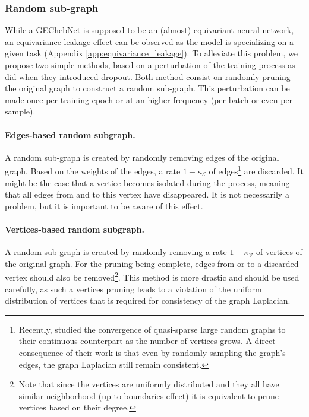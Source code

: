 \documentclass{article}
\newcommand{\haguettaz}[1]{{\color[rgb]{.8,.3,.2}{#1}}}
\begin{document}
\haguettaz{Figures pooling and unpooling?}

\subsubsection{Random sub-graph}

While a GEChebNet is supposed to be an (almost)-equivariant neural network, an equivariance leakage effect can be observed as the model is specializing on a given task (Appendix \ref{app:equivariance_leakage}). To alleviate this problem, we propose two simple methods, based on a perturbation of the training process as \cite{srivastava2014dropout} did when they introduced dropout. Both method consist on randomly pruning the original graph to construct a random sub-graph. This perturbation can be made once per training epoch or at an higher frequency (per batch or even per sample).

\paragraph{Edges-based random subgraph.} 
A random sub-graph is created by randomly removing edges of the original graph. Based on the weights of the edges, a rate $1 - \kappa_\mathcal{E}$ of edges\footnote{Recently, \cite{keriven2020convergence} studied the convergence of quasi-sparse large random graphs to their continuous counterpart as the number of vertices grows. A direct consequence of their work is that even by randomly sampling the graph's edges, the graph Laplacian still remain consistent.} are discarded. It might be the case that a vertice becomes isolated during the process, meaning that all edges from and to this vertex have disappeared. It is not necessarily a problem, but it is important to be aware of this effect. 
\paragraph{Vertices-based random subgraph.}  
A random sub-graph is created by randomly removing a rate $1-\kappa_\mathcal{V}$ of vertices of the original graph. For the pruning being complete, edges from or to a discarded vertex should also be removed\footnote{Note that since the vertices are uniformly distributed and they all have similar neighborhood (up to boundaries effect) it is equivalent to prune vertices based on their degree.}. This method is more drastic and should be used carefully, as such a vertices pruning leads to a violation of the uniform distribution of vertices that is required for consistency of the graph Laplacian. 
\end{document}
